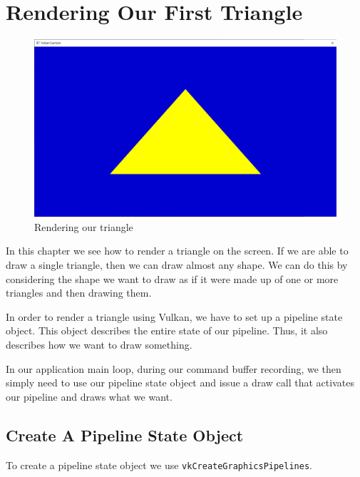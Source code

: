 \chapter{Rendering Our First Triangle}

\begin{figure}[ht]
    \centering
    \includegraphics[scale=0.20]{images/ChTriangle/Triangle.png}
    \caption{Rendering our triangle}
    \label{fig::RenderTriangle}
\end{figure}

In this chapter we see how to render a triangle on the screen.
If we are able to draw a single triangle, then we can draw almost any shape.
We can do this by considering the shape we want to draw as if it were
made up of one or more triangles and then drawing them.

In order to render a triangle using Vulkan, we have to set up a pipeline state
object.
This object describes the entire state of our pipeline.
Thus, it also describes how we want to draw something.

In our application main loop, during our command buffer recording, we then
simply need to use our pipeline state object and issue a draw call that activates
our pipeline and draws what we want.

\section{Create A Pipeline State Object}

To create a pipeline state object we use \texttt{vkCreateGraphicsPipelines}.

\begin{minipage}{\linewidth}{\noindent}
    
\end{minipage}

